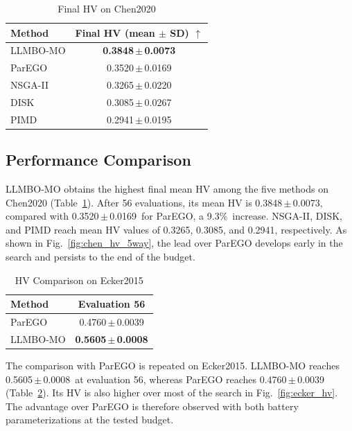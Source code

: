 \documentclass[journal]{IEEEtran}
\newcommand{\ChenLLMBOMean}{0.3848}
\newcommand{\ChenLLMBOStd}{0.0073}
\newcommand{\ChenParEGOMean}{0.3520}
\newcommand{\ChenParEGOStd}{0.0169}
\newcommand{\ChenFinalGain}{9.3\%}
\newcommand{\ChenNSGAMean}{0.3265}
\newcommand{\ChenNSGAStd}{0.0220}
\newcommand{\ChenDISKMean}{0.3085}
\newcommand{\ChenDISKStd}{0.0267}
\newcommand{\ChenPIMDMean}{0.2941}
\newcommand{\ChenPIMDStd}{0.0195}
\newcommand{\EckerParEGOMean}{0.4760}
\newcommand{\EckerParEGOStd}{0.0039}
\newcommand{\EckerLLMBOMean}{0.5605}
\newcommand{\EckerLLMBOStd}{0.0008}
\begin{document}
\begin{table}[!t]
\caption{Final HV on Chen2020}
\label{tab:chen_results}
\centering
\footnotesize
\setlength{\tabcolsep}{4.0pt}
\begin{tabular}{@{}lc@{}}
\toprule
Method & Final HV (mean $\pm$ SD) $\uparrow$ \\
\midrule
LLMBO-MO & \textbf{\ChenLLMBOMean\,$\pm$\,\ChenLLMBOStd} \\
ParEGO & \ChenParEGOMean\,$\pm$\,\ChenParEGOStd \\
NSGA-II & \ChenNSGAMean\,$\pm$\,\ChenNSGAStd \\
DISK & \ChenDISKMean\,$\pm$\,\ChenDISKStd \\
PIMD & \ChenPIMDMean\,$\pm$\,\ChenPIMDStd \\
\bottomrule
\end{tabular}
\end{table}

\subsection{Performance Comparison}

LLMBO-MO obtains the highest final mean HV among the five methods on Chen2020
(Table~\ref{tab:chen_results}). After 56 evaluations, its mean HV is
\ChenLLMBOMean\,$\pm$\,\ChenLLMBOStd, compared with
\ChenParEGOMean\,$\pm$\,\ChenParEGOStd\ for ParEGO, a
\ChenFinalGain\ increase. NSGA-II, DISK, and PIMD reach mean HV values of
\ChenNSGAMean, \ChenDISKMean, and \ChenPIMDMean, respectively.
As shown in Fig.~\ref{fig:chen_hv_5way}, the lead over ParEGO develops early
in the search and persists to the end of the budget.

\begin{table}[!t]
\caption{HV Comparison on Ecker2015}
\label{tab:ecker_results}
\centering
\footnotesize
\setlength{\tabcolsep}{4.0pt}
\begin{tabular}{@{}lc@{}}
\toprule
Method & Evaluation 56 \\
\midrule
ParEGO & \EckerParEGOMean\,$\pm$\,\EckerParEGOStd \\
LLMBO-MO & \textbf{\EckerLLMBOMean\,$\pm$\,\EckerLLMBOStd} \\
\bottomrule
\end{tabular}
\end{table}

The comparison with ParEGO is repeated on Ecker2015. LLMBO-MO reaches
\EckerLLMBOMean\,$\pm$\,\EckerLLMBOStd\ at evaluation 56, whereas ParEGO
reaches \EckerParEGOMean\,$\pm$\,\EckerParEGOStd
(Table~\ref{tab:ecker_results}). Its HV is also higher over most of the search
in Fig.~\ref{fig:ecker_hv}. The advantage over ParEGO is therefore observed
with both battery parameterizations at the tested budget.
\end{document}

